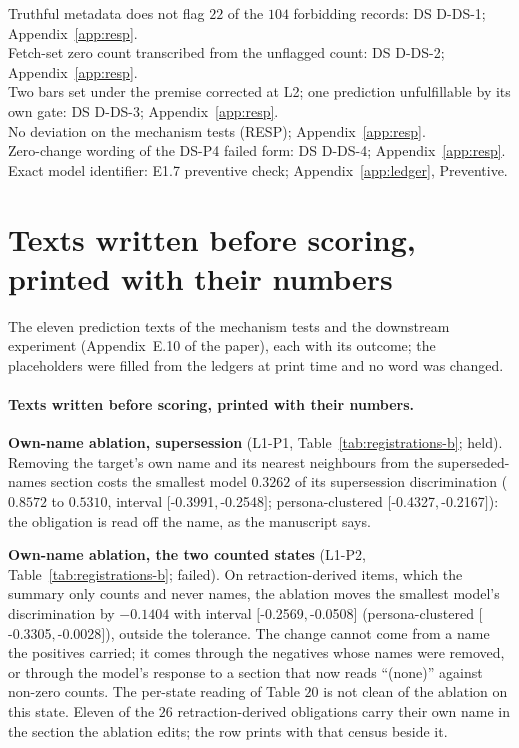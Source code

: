\documentclass{article}
\begin{document}
Truthful metadata does not flag $22$ of the $104$ forbidding records: DS D-DS-1; Appendix~\ref{app:resp}.\\
Fetch-set zero count transcribed from the unflagged count: DS D-DS-2; Appendix~\ref{app:resp}.\\
Two bars set under the premise corrected at L2; one prediction unfulfillable by its own gate: DS D-DS-3; Appendix~\ref{app:resp}.\\
No deviation on the mechanism tests (RESP); Appendix~\ref{app:resp}.\\
Zero-change wording of the DS-P4 failed form: DS D-DS-4; Appendix~\ref{app:resp}.\\
Exact model identifier: E1.7 preventive check; Appendix~\ref{app:ledger}, Preventive.

\section{Texts written before scoring, printed with their numbers}\label{sup:frozen-texts}

The eleven prediction texts of the mechanism tests and the downstream experiment (Appendix~E.10 of the paper), each with its outcome; the placeholders were filled from the ledgers at print time and no word was changed.

\paragraph{Texts written before scoring, printed with their numbers.}
\noindent\textbf{Own-name ablation, supersession} (L1-P1, Table~\ref{tab:registrations-b}; held). Removing the target's own name and its nearest neighbours from the superseded-names section costs the smallest model $0.3262$ of its supersession discrimination ($0.8572$ to $0.5310$, interval $[$-0.3991$,$-0.2548$]$; persona-clustered $[$-0.4327$,$-0.2167$]$): the obligation is read off the name, as the manuscript says.

\noindent\textbf{Own-name ablation, the two counted states} (L1-P2, Table~\ref{tab:registrations-b}; failed). On retraction-derived items, which the summary only counts and never names, the ablation moves the smallest model's discrimination by $-0.1404$ with interval $[$-0.2569$,$-0.0508$]$ (persona-clustered $[$-0.3305$,$-0.0028$]$), outside the tolerance. The change cannot come from a name the positives carried; it comes through the negatives whose names were removed, or through the model's response to a section that now reads ``(none)'' against non-zero counts. The per-state reading of Table $20$ is not clean of the ablation on this state. Eleven of the $26$ retraction-derived obligations carry their own name in the section the ablation edits; the row prints with that census beside it.
\end{document}
